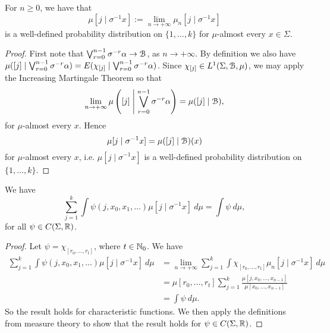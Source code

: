 \begin{proposition}\label{prop:mu-sq-bkt-pd}
	For $n \geq 0$, we have that
	\[
		\mu[j \mid \sigma^{-1}{x}] := \lim_{n \to +\infty}{\mu_n[j \mid \sigma^{-1}{x}]}
	\]
	is a well-defined probability distribution on $\{1, \dots, k\}$ for $\mu$-almost every $x \in \Sigma$.
	\begin{proof}
		First note that $\bigvee_{r = 0}^{n - 1}{\sigma^{-r}{\alpha}} \to \mathcal{B}$, as $n \to +\infty$. By definition we also have $\mu([j] \mid \bigvee_{r = 0}^{n - 1}{\sigma^{-r}{\alpha}}) = E(\chi_{[j]} \mid \bigvee_{r = 0}^{n - 1}{\sigma^{-r}{\alpha}})$. Since $\chi_{[j]} \in L^1(\Sigma, \mathcal{B}, \mu)$, we may apply the Increasing Martingale Theorem so that
		\[
			\lim_{n \to +\infty}{\mu\left([j] \mathrel{}\middle|\mathrel{} \bigvee_{r = 0}^{n - 1}{\sigma^{-r}{\alpha}}\right)} = \mu([j] \mid \mathcal{B}),
		\]
		for $\mu$-almost every $x$. Hence
		\[
			\mu[j \mid \sigma^{-1}{x}] = \mu([j] \mid \mathcal{B})(x)
		\]
		for $\mu$-almost every $x$, i.e. $\mu[j \mid \sigma^{-1}{x}]$ is a well-defined probability distribution on $\{1, \dots, k\}$.
	\end{proof}
\end{proposition}

\begin{lemma} \label{lem:pp-prop-p36}
	We have
	\begin{equation}
		\sum_{j = 1}^k{\int{\psi(j, x_0, x_1, \dots) \mu[j \mid \sigma^{-1}{x}] \ d\mu}} = \int{\psi\ d\mu},
	\end{equation}
	for all $\psi \in C(\Sigma, \mathbb{R})$.
	\begin{proof}
		Let $\psi = \chi_{[r_0, \dots, r_t]}$, where $t \in \mathbb{N}_0$. We have
		\begin{align*}
			\sum_{j = 1}^k{\int{\psi(j, x_0, x_1, \dots) \mu[j \mid \sigma^{-1}{x}] \ d\mu}} &= \lim_{n \to +\infty}{\sum_{j = 1}^k{\int{\chi_{[r_0, \dots, r_t]} \mu_n[j \mid \sigma^{-1}{x}] \ d\mu}}} \\
				&= \mu[r_0, \dots, r_t] \sum_{j = 1}^k{\frac{\mu[j, x_0, \dots, x_{n - 1}]}{\mu[x_0, \dots, x_{n - 1}]}} \\
				&= \int{\psi\ d\mu}.
		\end{align*}
		So the result holds for characteristic functions. We then apply the definitions from measure theory to show that the result holds for $\psi \in C(\Sigma, \mathbb{R})$.
	\end{proof}
\end{lemma}

